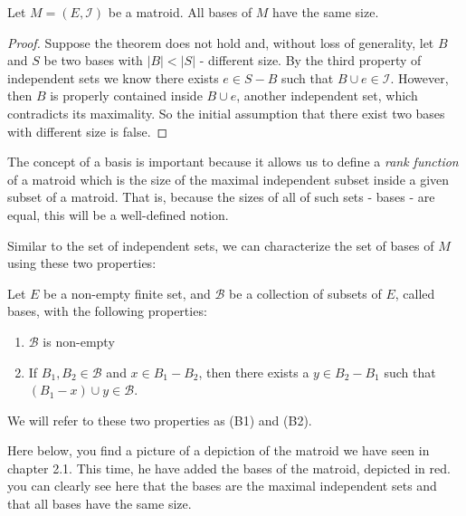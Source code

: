 \begin{theorem}
    Let $M = (E, \mathcal{I})$ be a matroid. All bases of $M$ have the same size.
\end{theorem}

\begin{proof}
    Suppose the theorem does not hold and, without loss of generality, let $B$ and $S$ be two bases with $|B| < |S|$ - different size. By the third property of independent sets we know there exists $e \in S - B$ such that $ B \cup e \in \mathcal{I}$. However, then $B$ is properly contained inside $B \cup e$, another independent set, which contradicts its maximality. So the initial assumption that there exist two bases with different size is false.
\end{proof}

The concept of a basis is important because it allows us to define a \textit{rank function} of a matroid which is the size of the maximal independent subset inside a given subset of a matroid. That is, because the sizes of all of such sets - bases - are equal, this will be a well-defined notion.

Similar to the set of independent sets, we can characterize the set of bases of $M$ using these two properties:

\begin{defn}
    Let $E$ be a non-empty finite set, and $\mathcal{B}$ be a collection of subsets of $E$, called bases, with the following properties:
    \begin{enumerate}
        \item $\mathcal{B}$ is non-empty
        \item If $B_1,B_2\in\mathcal{B}$ and $x\in B_1 - B_2$, then there exists a $y\in B_2 - B_1$ such that $(B_1 - x)\cup y \in\mathcal{B}$.
    \end{enumerate}
    We will refer to these two properties as (B1) and (B2).
\end{defn}
Here below, you find a picture of a depiction of the matroid we have seen in chapter 2.1. This time, he have added the bases of the matroid, depicted in red. you can clearly see here that the bases are the maximal independent sets and that all bases have the same size.

